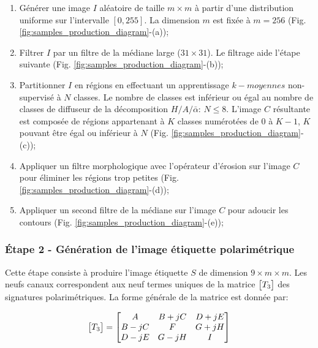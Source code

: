 \begin{enumerate}
    \item Générer une image $I$ aléatoire de taille $m \times m$ à partir d'une distribution uniforme sur l'intervalle $[0, 255]$. La dimension $m$ est fixée à $m=256$ (Fig. \ref{fig:samples_production_diagram}-(a));
    \item Filtrer $I$ par un filtre de la médiane large ($31 \times 31$).  Le filtrage aide l'étape suivante (Fig. \ref{fig:samples_production_diagram}-(b));
    \item Partitionner $I$ en régions en effectuant un apprentissage $k-moyennes$ non-supervisé à $N$ classes.  Le nombre de classes est inférieur ou égal au nombre de classes de diffuseur de la décomposition  $H/A/\bar{\alpha}$: $N \leq 8$.  L'image $C$ résultante est composée de régions appartenant à $K$ classes numérotées de 0 à $K-1$, $K$ pouvant être égal ou inférieur à $N$ (Fig. \ref{fig:samples_production_diagram}-(c));
    \item Appliquer un filtre morphologique avec l'opérateur d'érosion sur l'image $C$  pour éliminer les régions trop petites (Fig. \ref{fig:samples_production_diagram}-(d));
    \item Appliquer un second filtre de la médiane sur l'image $C$ pour adoucir les contours (Fig. \ref{fig:samples_production_diagram}-(e));
\end{enumerate}

\subsubsection{Étape 2 - Génération de l'image étiquette polarimétrique} \label{sec:gen_data}

Cette étape consiste à produire l'image étiquette $S$ de dimension $9 \times m \times m$.  Les neufs canaux correspondent aux neuf termes uniques de la matrice $\begin{bmatrix} T_3 \end{bmatrix}$ des signatures polarimétriques.  La forme générale de la matrice \matcoh est donnée par:

\begin{equation}
    \begin{bmatrix} T_3 \end{bmatrix} = 
    \begin{bmatrix}
    A   &   B+jC    &   D+jE    \\
    B-jC    &   F & G+jH    \\
    D-jE     &  G-jH  & I  
    \end{bmatrix}
\end{equation}

\vspace{5pt}

